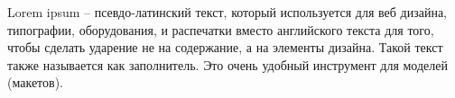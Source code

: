 Lorem ipsum – псевдо-латинский текст, который используется для веб дизайна, типографии, оборудования,
и распечатки вместо английского текста для того, чтобы сделать ударение не на содержание, а на элементы дизайна.
Такой текст также называется как заполнитель.
Это очень удобный инструмент для моделей (макетов).